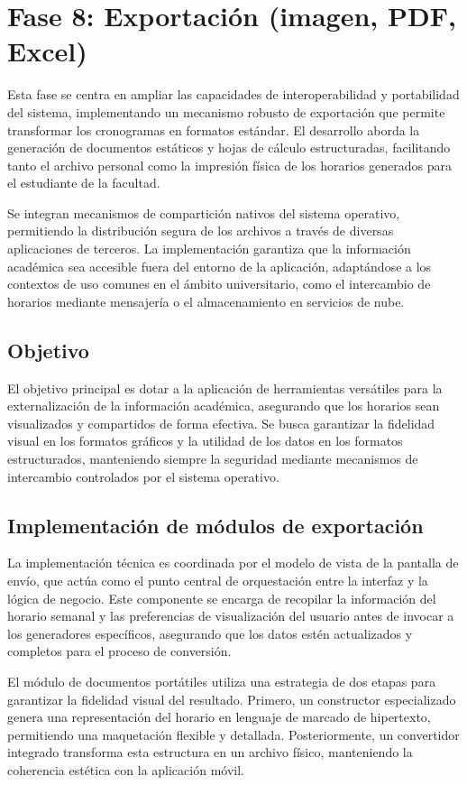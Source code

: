 \section{Fase 8: Exportación (imagen, PDF, Excel)}
Esta fase se centra en ampliar las capacidades de interoperabilidad y portabilidad del sistema, implementando un mecanismo robusto de exportación que permite transformar los cronogramas en formatos estándar. El desarrollo aborda la generación de documentos estáticos y hojas de cálculo estructuradas, facilitando tanto el archivo personal como la impresión física de los horarios generados para el estudiante de la facultad.

Se integran mecanismos de compartición nativos del sistema operativo, permitiendo la distribución segura de los archivos a través de diversas aplicaciones de terceros. La implementación garantiza que la información académica sea accesible fuera del entorno de la aplicación, adaptándose a los contextos de uso comunes en el ámbito universitario, como el intercambio de horarios mediante mensajería o el almacenamiento en servicios de nube.

\subsection{Objetivo}
El objetivo principal es dotar a la aplicación de herramientas versátiles para la externalización de la información académica, asegurando que los horarios sean visualizados y compartidos de forma efectiva. Se busca garantizar la fidelidad visual en los formatos gráficos y la utilidad de los datos en los formatos estructurados, manteniendo siempre la seguridad mediante mecanismos de intercambio controlados por el sistema operativo.

\subsection{Implementación de módulos de exportación}
La implementación técnica es coordinada por el modelo de vista de la pantalla de envío, que actúa como el punto central de orquestación entre la interfaz y la lógica de negocio. Este componente se encarga de recopilar la información del horario semanal y las preferencias de visualización del usuario antes de invocar a los generadores específicos, asegurando que los datos estén actualizados y completos para el proceso de conversión.

El módulo de documentos portátiles utiliza una estrategia de dos etapas para garantizar la fidelidad visual del resultado. Primero, un constructor especializado genera una representación del horario en lenguaje de marcado de hipertexto, permitiendo una maquetación flexible y detallada. Posteriormente, un convertidor integrado transforma esta estructura en un archivo físico, manteniendo la coherencia estética con la aplicación móvil.

